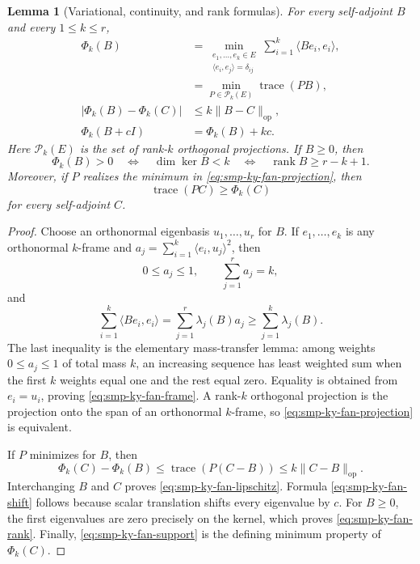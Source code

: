 \documentclass[10pt]{coll-l}
\newcommand{\trace}{\operatorname{trace}}
\newtheorem{lemma}[theorem]{Lemma}
\theoremstyle{definition}
\theoremstyle{remark}
\numberwithin{section}{chapter}
\numberwithin{equation}{chapter}
\begin{document}
\begin{lemma}[Variational, continuity, and rank formulas]
\label{lem:smp-ky-fan}
For every self-adjoint $B$ and every $1\leq k\leq r$,
\begin{align}
 \Phi_k(B)
   &=\min_{\substack{e_1,\ldots,e_k\in E\\
                     \langle e_i,e_j\rangle=\delta_{ij}}}
      \sum_{i=1}^k\langle Be_i,e_i\rangle,               \label{eq:smp-ky-fan-frame}\\
   &=\min_{P\in\mathcal P_k(E)}\trace(PB),               \label{eq:smp-ky-fan-projection}\\
 |\Phi_k(B)-\Phi_k(C)|
   &\leq k\|B-C\|_{\mathrm{op}},                         \label{eq:smp-ky-fan-lipschitz}\\
 \Phi_k(B+cI)&=\Phi_k(B)+kc.                             \label{eq:smp-ky-fan-shift}
\end{align}
Here $\mathcal P_k(E)$ is the set of rank-$k$ orthogonal projections.
If $B\geq0$, then
\begin{equation}
 \Phi_k(B)>0
 \quad\Longleftrightarrow\quad
 \dim\ker B<k
 \quad\Longleftrightarrow\quad
 \operatorname{rank}B\geq r-k+1.                        \label{eq:smp-ky-fan-rank}
\end{equation}
Moreover, if $P$ realizes the minimum in
\eqref{eq:smp-ky-fan-projection}, then
\begin{equation}
                 \trace(PC)\geq\Phi_k(C)                 \label{eq:smp-ky-fan-support}
\end{equation}
for every self-adjoint $C$.
\end{lemma}

\begin{proof}
Choose an orthonormal eigenbasis $u_1,\ldots,u_r$ for $B$.  If
$e_1,\ldots,e_k$ is any orthonormal $k$-frame and
$a_j=\sum_{i=1}^k\langle e_i,u_j\rangle^2$, then
\[
       0\leq a_j\leq1,
       \qquad
       \sum_{j=1}^r a_j=k,
\]
and
\[
 \sum_{i=1}^k\langle Be_i,e_i\rangle
 =\sum_{j=1}^r\lambda_j(B)a_j
 \geq\sum_{j=1}^k\lambda_j(B).
\]
The last inequality is the elementary mass-transfer lemma: among weights
$0\leq a_j\leq1$ of total mass $k$, an increasing sequence has least
weighted sum when the first $k$ weights equal one and the rest equal zero.
Equality is obtained from $e_i=u_i$, proving
\eqref{eq:smp-ky-fan-frame}.  A rank-$k$ orthogonal projection is the
projection onto the span of an orthonormal $k$-frame, so
\eqref{eq:smp-ky-fan-projection} is equivalent.

If $P$ minimizes for $B$, then
\[
 \Phi_k(C)-\Phi_k(B)
 \leq\trace(P(C-B))
 \leq k\|C-B\|_{\mathrm{op}}.
\]
Interchanging $B$ and $C$ proves
\eqref{eq:smp-ky-fan-lipschitz}.  Formula
\eqref{eq:smp-ky-fan-shift} follows because scalar translation shifts every
eigenvalue by $c$.  For $B\geq0$, the first eigenvalues are zero precisely
on the kernel, which proves \eqref{eq:smp-ky-fan-rank}.  Finally,
\eqref{eq:smp-ky-fan-support} is the defining minimum property of
$\Phi_k(C)$.
\end{proof}
\end{document}

